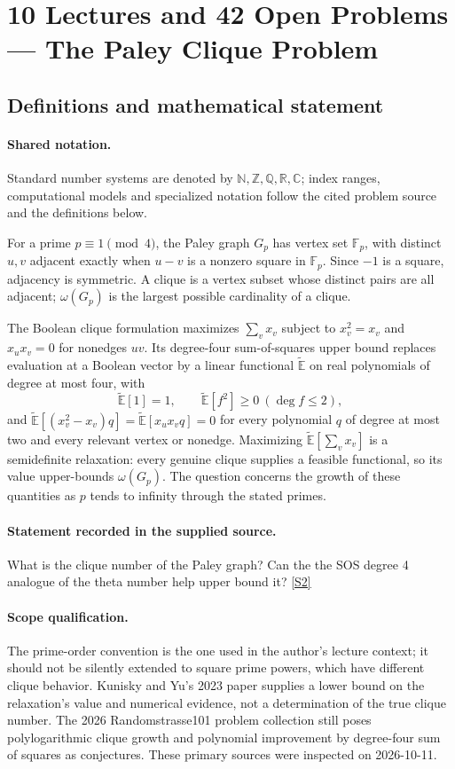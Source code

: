 \documentclass[11pt]{article}
\newcommand{\sref}[2]{\hyperlink{source:#1:#2}{[S#2]}}
\begin{document}
\section{10 Lectures and 42 Open Problems — The Paley Clique Problem}\label{statement}

\subsection{Definitions and mathematical statement}

\paragraph{Shared notation.}Standard number systems are denoted by $\mathbb N,\mathbb Z,\mathbb Q,\mathbb R,\mathbb C$; index ranges, computational models and specialized notation follow the cited problem source and the definitions below.


For a prime $p\equiv1\pmod4$, the Paley graph $G_p$ has vertex set $\mathbb{F}_p$, with distinct $u,v$ adjacent exactly when $u-v$ is a nonzero square in $\mathbb{F}_p$. Since $-1$ is a square, adjacency is symmetric. A clique is a vertex subset whose distinct pairs are all adjacent; $\omega(G_p)$ is the largest possible cardinality of a clique.

The Boolean clique formulation maximizes $\sum_v x_v$ subject to $x_v^2=x_v$ and $x_ux_v=0$ for nonedges $uv$. Its degree-four sum-of-squares upper bound replaces evaluation at a Boolean vector by a linear functional $\widetilde{\mathbb{E}}$ on real polynomials of degree at most four, with
\[
 \widetilde{\mathbb{E}}[1]=1,\qquad
 \widetilde{\mathbb{E}}[f^2]\ge0\ (\deg f\le2),
\]
and $\widetilde{\mathbb{E}}[(x_v^2-x_v)q]=\widetilde{\mathbb{E}}[x_ux_vq]=0$ for every polynomial $q$ of degree at most two and every relevant vertex or nonedge. Maximizing $\widetilde{\mathbb{E}}[\sum_vx_v]$ is a semidefinite relaxation: every genuine clique supplies a feasible functional, so its value upper-bounds $\omega(G_p)$. The question concerns the growth of these quantities as $p$ tends to infinity through the stated primes.
\paragraph{Statement recorded in the supplied source.}
What is the clique number of the Paley graph? Can the the SOS degree 4 analogue of the theta number help upper bound it? \sref{statement}{2}
\paragraph{Scope qualification.}
The prime-order convention is the one used in the author's lecture context; it should not be silently extended to square prime powers, which have different clique behavior. Kunisky and Yu's 2023 paper supplies a lower bound on the relaxation's value and numerical evidence, not a determination of the true clique number. The 2026 Randomstrasse101 problem collection still poses polylogarithmic clique growth and polynomial improvement by degree-four sum of squares as conjectures. These primary sources were inspected on 2026-10-11.
\end{document}
